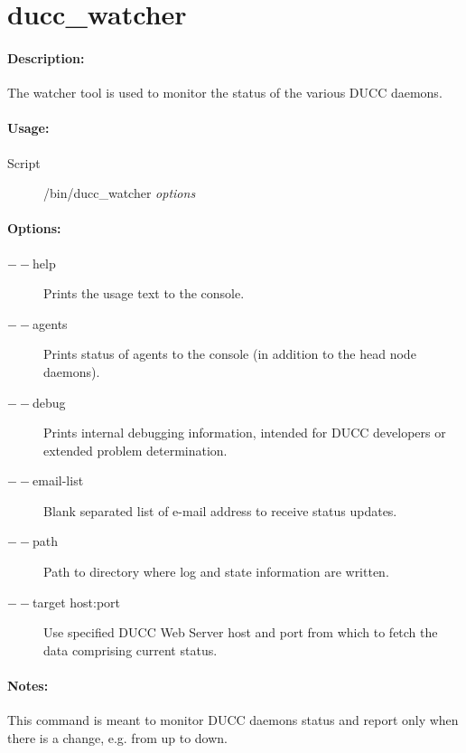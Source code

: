 % 
% 
% 
% 
\ifpdf
\else
{}
\fi
    \section{ducc\_watcher}
    \label{sec:cli.tools-ducc-watcher}    

  \paragraph{Description:}
    The watcher tool is used to monitor the status of the various DUCC daemons. 
   
  \paragraph{Usage:}
    \begin{description}
    \item[Script] \ducchome/bin/ducc\_watcher {\em options}
    \end{description}
    
  \paragraph{Options:}
    \begin{description}
    	\item[$--$help]
          Prints the usage text to the console. 
        \item[$--$agents]
          Prints status of agents to the console (in addition to the head node daemons). 
        \item[$--$debug]          
          Prints internal debugging information, intended for DUCC developers or extended problem determination.      
        \item[$--$email-list]          
          Blank separated list of e-mail address to receive status updates.    
        \item[$--$path]          
          Path to directory where log and state information are written.  
        \item[$--$target host:port]          
          Use specified DUCC Web Server host and port from which to fetch the data comprising current status.                                                                                               
     \end{description}
            
  \paragraph{Notes:}
    This command is meant to monitor DUCC daemons status and report only when there is a change, e.g. from up to down.
       